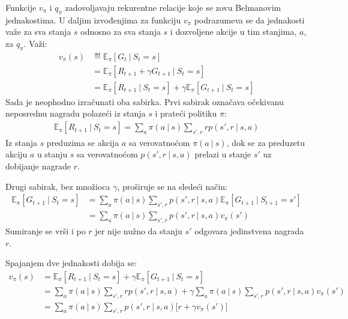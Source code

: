 Funkcije $v_{\pi}$ i $q_{\pi}$ zadovoljavaju rekurentne relacije koje se zovu Belmanovim jednakostima. U daljim izvođenjima za funkciju $v_{\pi}$ podrazumeva se da jednakosti važe za sva stanja $s$ odnosno za sva stanja $s$ i dozvoljene akcije u tim stanjima, $a$, za $q_{\pi}$. Važi:
\begin{equation}
	\begin{aligned}
		v_{\pi}(s) &\eqdef \mathbb{E}_{\pi}[G_t~|~S_t=s] \\ 
		&= \mathbb{E}_{\pi}[R_{t+1} + \gamma G_{t+1}~|~S_t=s] \\
		&= \mathbb{E}_{\pi}[R_{t+1}~|~S_t=s] + \gamma \mathbb{E}_{\pi}[G_{t+1}~|~S_t=s]
	\end{aligned}
\end{equation}
Sada je neophodno izračunati oba sabirka. Prvi sabirak označava očekivanu neposrednu nagradu polazeći iz stanja $s$ i prateći politiku $\pi$:
\begin{equation}
	\begin{aligned}
		\mathbb{E}_{\pi}[R_{t+1}~|~S_t=s] = \sum_{a}^{} \pi(a~|~s)\sum_{s', r}^{}rp(s', r~|~s, a)
	\end{aligned}
\end{equation}
Iz stanja $s$ preduzima se akcija $a$ sa verovatnoćom $\pi(a~|~s)$, dok se za preduzetu akciju $a$ u stanju $s$ sa verovatnoćom $p(s', r~|~s, a)$ prelazi u stanje $s'$ uz dobijanje nagrade $r$. 
\par 
Drugi sabirak, bez množioca $\gamma$, proširuje se na sledeći način:
\begin{equation}
	\begin{aligned}
		\mathbb{E}_{\pi}[G_{t+1}~|~S_t=s] &= \sum_{a}^{} \pi(a~|~s)\sum_{s',r}^{}p(s', r~|~s, a)\mathbb{E}_{\pi}[G_{t+1}~|~S_{t+1}=s'] \\
		&= \sum_{a}^{} \pi(a~|~s)\sum_{s',r}^{}p(s', r~|~s, a)v_{\pi}(s')
	\end{aligned}
\end{equation}
Sumiranje se vrši i po $r$ jer nije nužno da stanju $s'$ odgovara jedinstvena nagrada $r$.
\par 
Spajanjem dve jednakosti dobija se:
\begin{equation}
	\label{eq:bel_v}
	\begin{aligned}
		v_{\pi}(s)  &= \mathbb{E}_{\pi}[R_{t+1}~|~S_t=s] + \gamma \mathbb{E}_{\pi}[G_{t+1}~|~S_t=s] \\
		&= \sum_{a}^{} \pi(a~|~s)\sum_{s', r}^{}rp(s', r~|~s, a) + \gamma \sum_{a}^{} \pi(a~|~s)\sum_{s',r}^{}p(s', r~|~s, a)v_{\pi}(s') \\
		&= \sum_{a}^{} \pi(a~|~s)\sum_{s', r}^{}p(s', r~|~s, a) \big[ r+\gamma v_{\pi}(s') \big]
	\end{aligned}
\end{equation}

